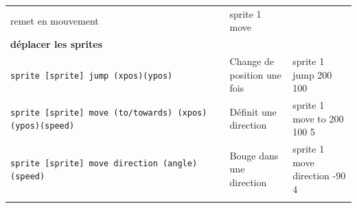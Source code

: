 \documentclass[
]{book}
\begin{document}
\begin{longtable}[]{@{}lll@{}}
\begin{minipage}[t]{0.25\columnwidth}
remet en mouvement\strut
\end{minipage} & \begin{minipage}[t]{0.25\columnwidth}\raggedright
sprite 1 move\strut
\end{minipage}\tabularnewline
\begin{minipage}[t]{0.40\columnwidth}\raggedright
\textbf{déplacer les sprites}\strut
\end{minipage} & \begin{minipage}[t]{0.25\columnwidth}\raggedright
\strut
\end{minipage} & \begin{minipage}[t]{0.25\columnwidth}\raggedright
\strut
\end{minipage}\tabularnewline
\begin{minipage}[t]{0.40\columnwidth}\raggedright
\texttt{sprite\ {[}sprite{]}\ jump\ (xpos)(ypos)}\strut
\end{minipage} & \begin{minipage}[t]{0.25\columnwidth}\raggedright
Change de position une fois\strut
\end{minipage} & \begin{minipage}[t]{0.25\columnwidth}\raggedright
sprite 1 jump 200 100\strut
\end{minipage}\tabularnewline
\begin{minipage}[t]{0.40\columnwidth}\raggedright
\texttt{sprite\ {[}sprite{]}\ move\ (to/towards)\ (xpos)(ypos)(speed)}\strut
\end{minipage} & \begin{minipage}[t]{0.25\columnwidth}\raggedright
Définit une direction\strut
\end{minipage} & \begin{minipage}[t]{0.25\columnwidth}\raggedright
sprite 1 move to 200 100 5\strut
\end{minipage}\tabularnewline
\begin{minipage}[t]{0.40\columnwidth}\raggedright
\texttt{sprite\ {[}sprite{]}\ move\ direction\ (angle)(speed)}\strut
\end{minipage} & \begin{minipage}[t]{0.25\columnwidth}\raggedright
Bouge dans une direction\strut
\end{minipage} & \begin{minipage}[t]{0.25\columnwidth}\raggedright
sprite 1 move direction -90 4\strut
\end{minipage}\tabularnewline
\begin{minipage}[t]{0.40\columnwidth}\raggedright

\end{minipage}
\end{longtable}
\end{document}
